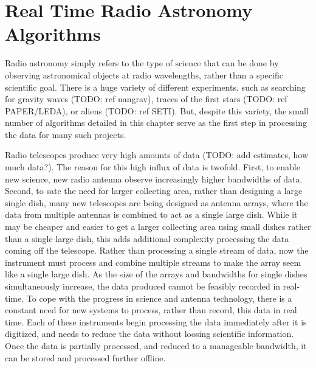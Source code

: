 \chapter{Real Time Radio Astronomy Algorithms}




Radio astronomy simply refers to the type of science that can be done by observing astronomical objects at radio wavelengths, rather than a specific scientific goal. 
There is a huge variety of different experiments, such as searching for gravity waves (TODO: ref nangrav), traces of the first stars (TODO: ref PAPER/LEDA), or aliens (TODO: ref SETI).
But, despite this variety, the small number of algorithms detailed in this chapter serve as the first step in processing the data for many such projects.



Radio telescopes produce very high amounts of data (TODO: add estimates, how much data?). 
The reason for this high influx of data is twofold. 
First, to enable new science, new radio antenna observe increasingly higher bandwidths of data. 
Second, to sate the need for larger collecting area, rather than designing a large single dish, many new telescopes are being designed as antenna arrays, where the data from multiple antennas is combined to act as a single large dish.
While it may be cheaper and easier to get a larger collecting area using small dishes rather than a single large dish, this adds additional complexity processing the data coming off the telescope.
Rather than processing a single stream of data, now the instrument must process and combine multiple streams to make the array seem like a single large dish.
As the size of the arrays and bandwidths for single dishes simultaneously increase, the data produced cannot be feasibly recorded in real-time. 
To cope with the progress in science and antenna technology, there is a constant need for new systems to process, rather than record, this data in real time.
Each of these instruments begin processing the data immediately after it is digitized, and needs to reduce the data without loosing scientific information.
Once the data is partially processed, and reduced to a manageable bandwidth, it can be stored and processed further offline.


